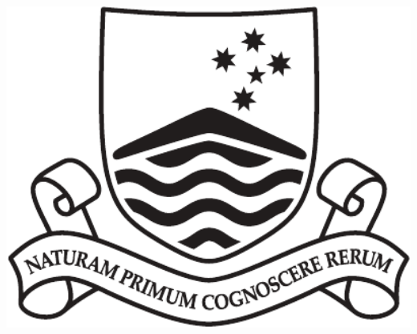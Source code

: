 \documentclass[b0,landscape,25pt]{sciposter}
\begin{document}
\begin{minipage}[t]{0.15\linewidth}
\centering
\includegraphics[height=12cm]{anu-logo-notext}
\end{minipage}


\end{document}
